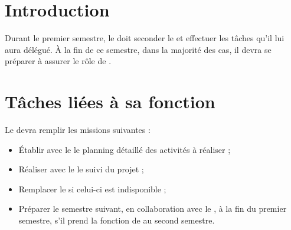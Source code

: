 \documentclass[11pt]{article}
\begin{document}

\section*{Introduction}


Durant le premier semestre, le \CPA{} doit seconder le \CP{} et effectuer les tâches qu’il lui aura délégué. À la fin de ce semestre, dans la majorité des cas, il devra se préparer à assurer le rôle de \CP.


\section*{Tâches liées à sa fonction}

Le \CPA{} devra remplir les missions suivantes :
\begin{itemize}
	\item Établir avec le \CP{} le planning détaillé des activités à réaliser ;
	\item Réaliser avec le \CP{} le suivi du projet ;
	\item Remplacer le \CP{} si celui-ci est indisponible ;

	\item Préparer le semestre suivant, en collaboration avec le \CP{}, à la fin du premier semestre, s’il prend la fonction de \CP{} au second semestre.

\end{itemize}
\end{document}
